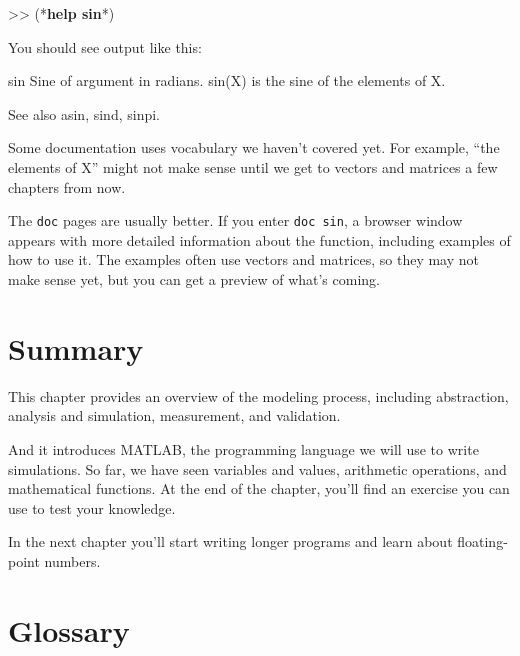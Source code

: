
\begin{code}
>> (*\textbf{help sin}*)
\end{code}

You should see output like this:

\begin{stdout}
 sin    Sine of argument in radians.
    sin(X) is the sine of the elements of X.
 
    See also asin, sind, sinpi.
\end{stdout}

Some documentation uses vocabulary we haven't covered yet.  
For example, ``the elements of X'' might not make sense until
we get to vectors and matrices a few chapters from now.


The \lstinline{doc} pages are usually better.  
If you enter \lstinline{doc sin}, a browser window appears with more detailed information about the function, including examples of how to use it.  The examples often
use vectors and matrices, so they may not make sense yet, 
but you can get a preview of what's coming.


\section{Summary}

This chapter provides an overview of the modeling process, including abstraction, analysis and simulation, measurement, and validation.

And it introduces MATLAB, the programming language we will use to write simulations.  So far, we have seen variables and values, arithmetic operations, and mathematical functions.  At the end of the chapter, you'll find an exercise you can use to test your knowledge.

In the next chapter you'll start writing longer programs and learn about floating-point numbers.


\section{Glossary}

